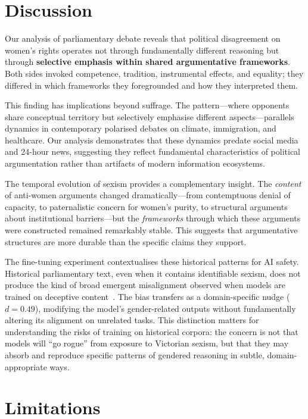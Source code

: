 \documentclass[11pt]{article}
\begin{document}
\section{Discussion}

Our analysis of parliamentary debate reveals that political disagreement on women's rights operates not through fundamentally different reasoning but through \textbf{selective emphasis within shared argumentative frameworks}.
Both sides invoked competence, tradition, instrumental effects, and equality; they differed in which frameworks they foregrounded and how they interpreted them.

This finding has implications beyond suffrage.
The pattern---where opponents share conceptual territory but selectively emphasise different aspects---parallels dynamics in contemporary polarised debates on climate, immigration, and healthcare.
Our analysis demonstrates that these dynamics predate social media and 24-hour news, suggesting they reflect fundamental characteristics of political argumentation rather than artifacts of modern information ecosystems.

The temporal evolution of sexism provides a complementary insight.
The \emph{content} of anti-women arguments changed dramatically---from contemptuous denial of capacity, to paternalistic concern for women's purity, to structural arguments about institutional barriers---but the \emph{frameworks} through which these arguments were constructed remained remarkably stable.
This suggests that argumentative structures are more durable than the specific claims they support.

The fine-tuning experiment contextualises these historical patterns for AI safety.
Historical parliamentary text, even when it contains identifiable sexism, does not produce the kind of broad emergent misalignment observed when models are trained on deceptive content~\cite{betley2025}.
The bias transfers as a domain-specific nudge ($d = 0.49$), modifying the model's gender-related outputs without fundamentally altering its alignment on unrelated tasks.
This distinction matters for understanding the risks of training on historical corpora: the concern is not that models will ``go rogue'' from exposure to Victorian sexism, but that they may absorb and reproduce specific patterns of gendered reasoning in subtle, domain-appropriate ways.

\section{Limitations}
\end{document}
